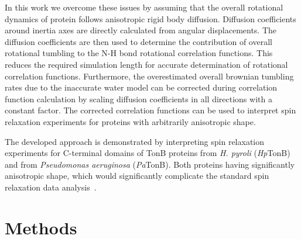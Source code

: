 \documentclass[pre,aps,floatfix,authordate1-4,twocolumn]{revtex4-1}
\begin{document}
In this work we overcome these issues by assuming that the overall
rotational dynamics of protein follows anisotropic rigid body diffusion.
Diffusion coefficients around inertia axes are 
directly calculated from angular displacements.
The diffusion coefficients are then used to determine the
contribution of overall rotational tumbling to the 
N-H bond rotational correlation functions.
This reduces the required simulation length for accurate determination
of rotational correlation functions. Furthermore, the overestimated
overall brownian tumbling rates due to the inaccurate water model
can be corrected during correlation function calculation by scaling
diffusion coefficients in all directions with a constant factor.
The corrected correlation functions can be used to interpret spin relaxation
experiments for proteins with arbitrarily anisotropic shape.

The developed approach is demonstrated by interpreting spin relaxation experiments
for C-terminal domains of TonB proteins from {\it H. pyroli} ({\it Hp}TonB)~\cite{ciragan16}
and from {\it Pseudomonas aeruginosa} ({\it Pa}TonB). Both proteins having significantly
anisotropic shape, which would significantly complicate the standard spin relaxation data
analysis~\cite{woessner62,shimizu62,jarymowycz06,korzhnev01,luginbuhl97,hall04}.


\section{Methods}
\end{document}
